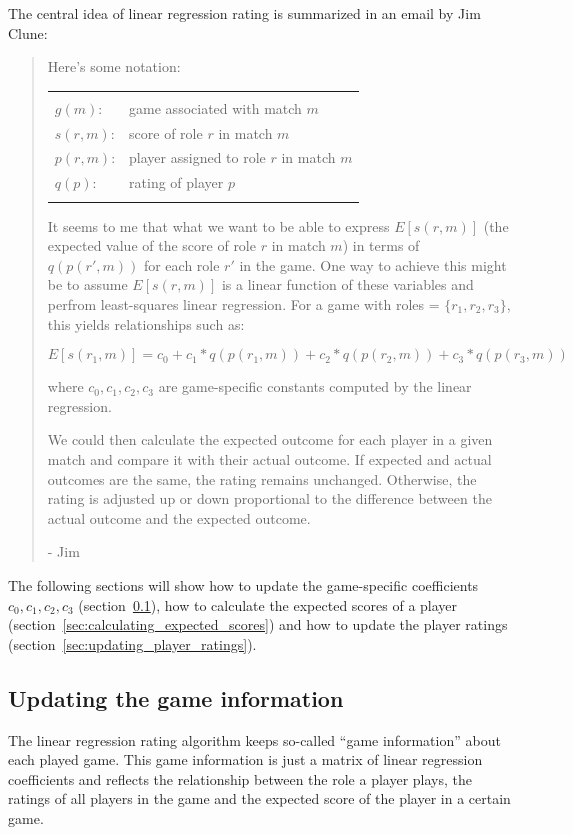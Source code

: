 \documentclass[a4paper,10pt]{article}
\begin{document}
The central idea of linear regression rating is summarized in an email by Jim Clune:
\begin{quotation}
Here's some notation:

\begin{tabular}{ll}
&\\
$g(m)$:    & game associated with match $m$ \\
$s(r, m)$: & score of role $r$ in match $m$ \\
$p(r, m)$: & player assigned to role $r$ in match $m$ \\
$q(p)$:    & rating of player $p$ \\
&
\end{tabular}

It seems to me that what we want to be able to express $E[s(r, m)]$ (the
expected value of the score of role $r$ in match $m$) in terms of $q(p(r', m))$
for each role $r'$ in the game. One way to achieve this might be to assume
$E[s(r, m)]$ is a linear function of these variables and perfrom least-squares
linear regression. For a game with roles = $\{r_1, r_2, r_3\}$, this yields
relationships such as:

\[E[s(r_1, m)] = c_0 + c_1*q(p(r_1, m)) + c_2*q(p(r_2, m)) + c_3*q(p(r_3, m))\]

where $c_0, c_1, c_2, c_3$ are game-specific constants computed by the linear
regression.

We could then calculate the expected outcome for each player in a
given match and compare it with their actual outcome. If expected and
actual outcomes are the same, the rating remains unchanged.
Otherwise, the rating is adjusted up or down proportional to the
difference between the actual outcome and the expected outcome.

- Jim
\end{quotation}

The following sections will show how to update the game-specific coefficients $c_0, c_1, c_2, c_3$ (section~\ref{sec:updating_game_information}), how to calculate the expected scores of a player (section~\ref{sec:calculating_expected_scores}) and how to update the player ratings (section~\ref{sec:updating_player_ratings}).

\subsection{Updating the game information}
\label{sec:updating_game_information}

The linear regression rating algorithm keeps so-called ``game information'' about each played game. This game information is just a matrix of linear regression coefficients and reflects the relationship between the role a player plays, the ratings of all players in the game and the expected score of the player in a certain game.
\end{document}
